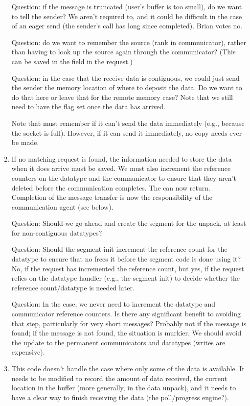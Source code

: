 \begin{enumerate}
  Question: if the message is truncated (user's buffer is too small), do 
  we want to tell the sender?  We aren't required to, and it could be
  difficult in the case of an eager send (the sender's call has long since
  completed).  Brian votes no.

  Question: do we want to remember the source (rank in communicator), rather
  than having to look up 
  the source again through the communicator?  (This can be saved in the
   field in the request.)

  Question: in the case that the receive data is contiguous, we could just
  send the sender the memory location of where to deposit the data.  Do we
  want to do that here or leave that for the remote memory case?  Note that
  we still need to have the  flag set once the data has
  arrived.  

  Note that  must remember  if it can't send
  the data immediately (e.g., because the socket is full).  However, if it can
  send it immediately, no copy needs ever be made.

\item If no matching request is found, the information needed to store the data
  when it does arrive must be saved.  We must also increment the reference
  counters on the datatype and the communicator to ensure that they aren't
  deleted before the communication completes.
  The  can now return.  Completion of the message transfer
  is now the responsibility of the communication agent (see below). 

  Question: Should we go ahead and create the segment for the unpack, at least
  for non-contiguous datatypes?

  Question: Should the segment init increment the reference count for the
  datatype to ensure that no  frees it before the
  segment code is done using it?  No, if the request has incremented the
  reference count, but yes, if the request relies on the datatype handler
  (e.g., the segment init) to decide whether the reference count/datatype is
  needed later.

  Question: In the  case, we never need to increment the
  datatype and communicator reference counters.  Is there any significant 
  benefit to avoiding that step, particularly for very short messages?
  Probably not if the message is found; if the message is not found, the
  situation is murkier.  We should avoid the update to the permanent
  communicators and datatypes (writes are expensive).

\item This code doesn't handle the case where only some of the data is
  available.  It needs to be modified to record the amount of data received,
  the current location in the buffer (more generally, in the data unpack), and
  it needs to have a clear way to finish receiving the data (the poll/progress
  engine?).
\end{enumerate}


